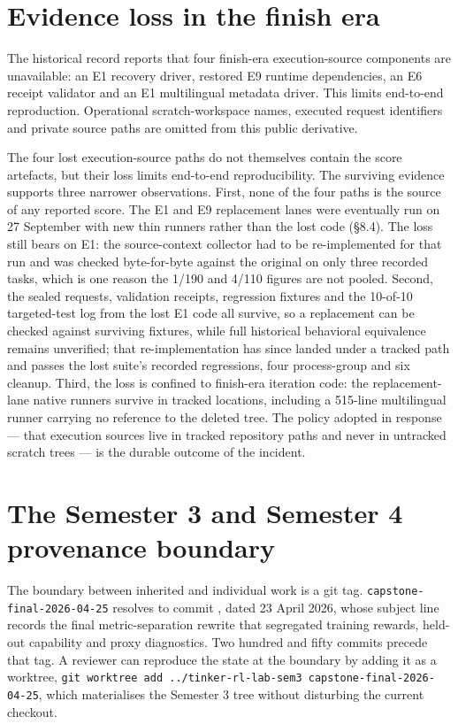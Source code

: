 \documentclass[12pt,a4paper]{report}
\DeclareRobustCommand{\longtok}[1]{\texttt{\seqsplit{#1}}}
\begin{document}
\section{Evidence loss in the finish
era}\label{evidence-loss-in-the-finish-era}

The historical record reports that four finish-era execution-source
components are unavailable: an E1 recovery driver, restored E9 runtime
dependencies, an E6 receipt validator and an E1 multilingual metadata
driver. This limits end-to-end reproduction. Operational
scratch-workspace names, executed request identifiers and private source
paths are omitted from this public derivative.

The four lost execution-source paths do not themselves contain the score
artefacts, but their loss limits end-to-end reproducibility. The
surviving evidence supports three narrower observations. First, none of
the four paths is the source of any reported score. The E1 and E9
replacement lanes were eventually run on 27 September with new thin
runners rather than the lost code (§8.4). The loss still bears on E1:
the source-context collector had to be re-implemented for that run and
was checked byte-for-byte against the original on only three recorded
tasks, which is one reason the 1/190 and 4/110 figures are not pooled.
Second, the sealed requests, validation receipts, regression fixtures
and the 10-of-10 targeted-test log from the lost E1 code all survive, so
a replacement can be checked against surviving fixtures, while full
historical behavioral equivalence remains unverified; that
re-implementation has since landed under a tracked path and passes the
lost suite's recorded regressions, four process-group and six cleanup.
Third, the loss is confined to finish-era iteration code: the
replacement-lane native runners survive in tracked locations, including
a 515-line multilingual runner carrying no reference to the deleted
tree. The policy adopted in response --- that execution sources live in
tracked repository paths and never in untracked scratch trees --- is the
durable outcome of the incident.

\section{The Semester 3 and Semester 4 provenance
boundary}\label{the-semester-3-and-semester-4-provenance-boundary}

The boundary between inherited and individual work is a git tag.
\texttt{capstone-final-2026-04-25} resolves to commit
\longtok{21a99ef766543a1ca86bfbad188445d3596ea73c}, dated 23 April 2026,
whose subject line records the final metric-separation rewrite that
segregated training rewards, held-out capability and proxy diagnostics.
Two hundred and fifty commits precede that tag. A reviewer can reproduce
the state at the boundary by adding it as a worktree,
\texttt{git\ worktree\ add\ ../tinker-rl-lab-sem3\ capstone-final-2026-04-25},
which materialises the Semester 3 tree without disturbing the current
checkout.
\end{document}
